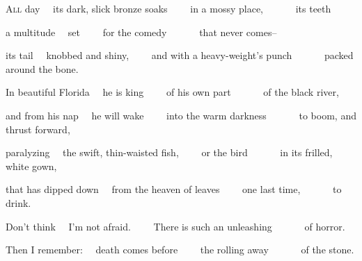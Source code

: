 \begin{poem}
\begin{stanza}
\textsc{All} day\verseline
~~its dark, slick bronze soaks\verseline
~~~~in a mossy place,\verseline
~~~~~~its teeth
\end{stanza}

\begin{stanza}
a multitude\verseline
~~set\verseline
~~~~for the comedy\verseline
~~~~~~that never comes--
\end{stanza}

\begin{stanza}
its tail\verseline
~~knobbed and shiny,\verseline
~~~~and with a heavy-weight's punch\verseline
~~~~~~packed around the bone.
\end{stanza}

\begin{stanza}
In beautiful Florida\verseline
~~he is king\verseline
~~~~of his own part\verseline
~~~~~~of the black river,
\end{stanza}

\begin{stanza}
and from his nap\verseline
~~he will wake\verseline
~~~~into the warm darkness\verseline
~~~~~~to boom, and thrust forward,
\end{stanza}

\begin{stanza}
paralyzing\verseline
~~the swift, thin-waisted fish,\verseline
~~~~or the bird\verseline
~~~~~~in its frilled, white gown,
\end{stanza}

\begin{stanza}
that has dipped down\verseline
~~from the heaven of leaves\verseline
~~~~one last time,\verseline
~~~~~~to drink.
\end{stanza}

\begin{stanza}
Don't think\verseline
~~I'm not afraid.\verseline
~~~~There is such an unleashing\verseline
~~~~~~of horror.
\end{stanza}

\begin{stanza}
Then I remember:\verseline
~~death comes before\verseline
~~~~the rolling away\verseline
~~~~~~of the stone.
\end{stanza}
\end{poem}

\newpage %


